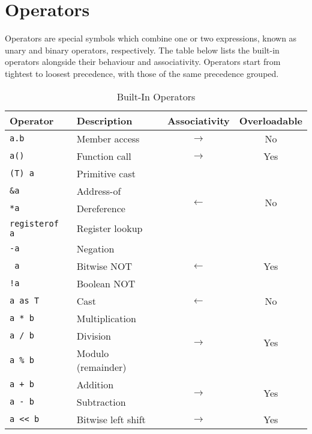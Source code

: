 \section{Operators}\label{sec:operators}

Operators are special symbols which combine one or two expressions, known as unary and binary operators, respectively.
The table below lists the built-in operators alongside their behaviour and associativity.
Operators start from tightest to loosest precedence, with those of the same precedence grouped.

\begin{table}[h]
    \centering
    \caption{Built-In Operators}
    \begin{tabular}{|l|l|c|c|}
        \hline
        \textbf{Operator} & \textbf{Description} & \textbf{Associativity} & \textbf{Overloadable} \\
        \hline
        \texttt{a.b} & Member access & \(\longrightarrow\) & No \\
        \hline
        \texttt{a()} & Function call & \(\longrightarrow\) & Yes \\
        \hline
        \texttt{(T) a} & Primitive cast & \multirow{4}{*}{\(\longleftarrow\)} & \multirow{4}{*}{No} \\
        \texttt{\&a} & Address-of & & \\
        \texttt{*a} & Dereference & & \\
        \texttt{registerof a} & Register lookup & & \\
        \hline
        \texttt{-a} & Negation & \multirow{3}{*}{\(\longleftarrow\)} & \multirow{3}{*}{Yes} \\
        \texttt{~a} & Bitwise NOT & & \\
        \texttt{!a} & Boolean NOT & & \\
        \hline
        \texttt{a as T} & Cast & \(\longleftarrow\) & No \\
        \hline
        \texttt{a * b} & Multiplication & \multirow{3}{*}{\(\longrightarrow\)} & \multirow{3}{*}{Yes} \\
        \texttt{a / b} & Division & & \\
        \texttt{a \% b} & Modulo (remainder) & & \\
        \hline
        \texttt{a + b} & Addition & \multirow{2}{*}{\(\longrightarrow\)} & \multirow{2}{*}{Yes} \\
        \texttt{a - b} & Subtraction & & \\
        \hline
        \texttt{a << b} & Bitwise left shift & \multirow{2}{*}{\(\longrightarrow\)} & \multirow{2}{*}{Yes} \\

\end{tabular}
\end{table}
